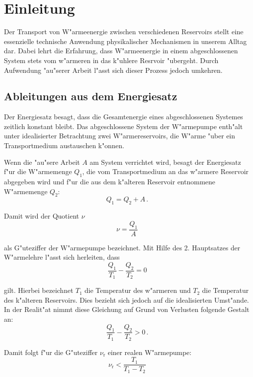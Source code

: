 \section{Einleitung}
\label{sec:einleitung}
	Der Transport von W"armeenergie zwischen verschiedenen Reservoirs stellt eine essenzielle technische Anwendung physikalischer Mechanismen in unserem Alltag dar.
	Dabei lehrt die Erfahrung, dass W"armeenergie in einem abgeschlossenen System stets vom w"armeren in das k"uhlere Resrvoir "ubergeht.
	Durch Aufwendung "au"serer Arbeit l"asst sich dieser Prozess jedoch umkehren.

	\subsection{Ableitungen aus dem Energiesatz}
	\label{subsec:energiesatz}
		Der Energiesatz besagt, dass die Gesamtenergie eines abgeschlossenen Systemes zeitlich konstant bleibt.
		Das abgeschlossene System der W"armepumpe enth"alt unter idealisierter Betrachtung zwei W"armereservoirs, die W"arme "uber ein Transportmedium austauschen k"onnen.

		Wenn die "au"sere Arbeit $A$ am System verrichtet wird, besagt der Energiesatz f"ur die W"armemenge $Q_1$, die vom Transportmedium an das w"armere Reservoir abgegeben wird und f"ur die aus dem k"alteren Reservoir entnommene W"armemenge $Q_2$:
		\begin{equation*}
			Q_1 = Q_2 + A \,.
		\end{equation*}

		Damit wird der Quotient $\nu$
		\begin{equation*}
			\nu = \frac{Q_1}{A}
		\end{equation*}

		als G"uteziffer der W"armepumpe bezeichnet.
		Mit Hilfe des 2. Hauptsatzes der W"armelehre l"asst sich herleiten, dass
		\begin{equation*}
			\frac{Q_1}{T_1} - \frac{Q_2}{T_2} = 0
		\end{equation*}

		gilt.
		Hierbei bezeichnet $T_1$ die Temperatur des w"armeren und $T_2$ die Temperatur des k"alteren Reservoirs.
		Dies bezieht sich jedoch auf die idealisierten Umst"ande. In der Realit"at nimmt diese Gleichung auf Grund von Verlusten folgende Gestalt an:
		\begin{equation}
			\frac{Q_1}{T_1} - \frac{Q_2}{T_2} > 0 \,.
		\end{equation}

		Damit folgt f"ur die G"uteziffer $\nu_\mathrm{r}$ einer realen W"armepumpe:
		\begin{equation}
			\nu_\mathrm{r} < \frac{T_1}{T_1 - T_2}
		\end{equation}

